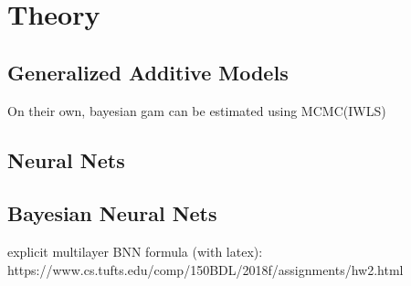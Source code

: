 \documentclass[11pt]{article}
\begin{document}
    \clearpage
    \section{Theory}
        \subsection{Generalized Additive Models}
        On their own, bayesian gam can be estimated using MCMC(IWLS) \citep{}
        \subsection{Neural Nets}
        \subsection{Bayesian Neural Nets}
        explicit multilayer BNN formula (with latex): https://www.cs.tufts.edu/comp/150BDL/2018f/assignments/hw2.html







\end{document}
